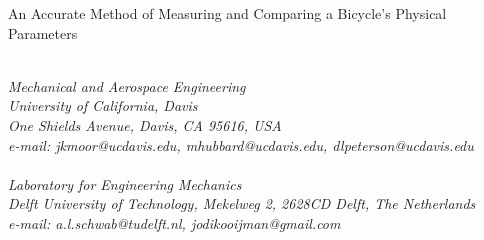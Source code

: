 \documentclass{bmd2010a}
\begin{document}
\begin{flushleft}
{\fontsize{16pt}{20pt}\selectfont%
  An Accurate Method of Measuring and Comparing a Bicycle's Physical Parameters\\}
\end{flushleft}

\begin{flushleft}
  {\\}
  \textit{Mechanical and Aerospace Engineering\\
          University of California, Davis\\
          One Shields Avenue, Davis, CA 95616, USA\\
          e-mail: jkmoor@ucdavis.edu, mhubbard@ucdavis.edu,
          dlpeterson@ucdavis.edu
  }\vspace{10pt}\\
  {\\}
  \textit{Laboratory for Engineering Mechanics\\
          Delft University of Technology, Mekelweg 2, 2628CD Delft, The
          Netherlands\\
          e-mail: a.l.schwab@tudelft.nl, jodikooijman@gmail.com
  }\vspace{10pt}\\
\end{flushleft}
\end{document}
